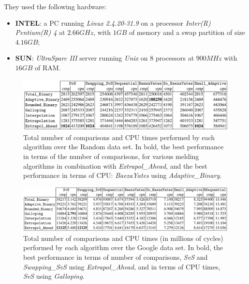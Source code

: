 They used the following hardware:
\begin{itemize}
    \item \textbf{INTEL}: a PC running \textit{Linux 2.4.20-31.9} on a processor \textit{Inter(R) Pentium(R) 4} at $2.66GHz$, with $1GB$ of memory and a swap partition of size $4.16GB$;
    \item \textbf{SUN}: \textit{UltraSparc III} server running \textit{Unix} on 8 processors at $900MHz$ with $16GB$ of RAM.
\end{itemize}


\begin{figure}[h] 
    \begin{center}
        \includegraphics[width=.8\textwidth]{imgs/barbay_table3.png}
        \caption{Total number of comparisons and CPU times performed by each algorithm over the Random data set. In bold, the best
        performance in terms of the number of comparisons, for various melding algorithms in combination with \textit{Extrapol\_Ahead}, and
        the best performance in terms of CPU: \textit{BaezaYates} using \textit{Adaptive\_Binary}. \citep{barbay_ortiz} \label{fig:barbay1}}
    \end{center}
\end{figure}

\begin{figure}[h] 
    \begin{center}
        \includegraphics[width=.8\textwidth]{imgs/barbay_table5.png}
        \caption{Total number of comparisons and CPU times (in millions of cycles) performed by each algorithm over the Google data set.
        In bold, the best performance in terms of number of comparisons, \textit{SvS} and \textit{Swapping\_SvS} using \textit{Extrapol\_Ahead}, and in terms
        of CPU times, \textit{SvS} using \textit{Galloping}. \citep{barbay_ortiz} \label{fig:barbay2}}
    \end{center}
\end{figure}


